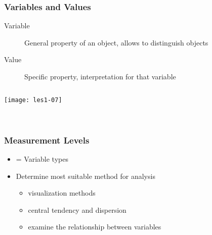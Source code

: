 \documentclass[aspectratio=169]{beamer}
\begin{document}
\begin{frame}
  \frametitle{Variables and Values}
  
  \begin{description}
    \item[Variable] General property of an object, allows to distinguish objects
    \item[Value] Specific property, interpretation for that variable
  \end{description}
  
  \vspace{1cm}
  
  \begin{columns}[c]
    \centering
    \texttt{[image: les1-07]}
    
    \\
    \vspace{.5cm}
    \\
    \vspace{.5cm}
    
  \end{columns}
\end{frame}

\begin{frame}
  \frametitle{Measurement Levels}
  
  \begin{itemize}
    \item = Variable types
    \item Determine most suitable method for analysis
    \begin{itemize}
      \item visualization methods
      \item central tendency and dispersion
      \item examine the relationship between variables
    \end{itemize}
  \end{itemize}
  
\end{frame}
\end{document}
